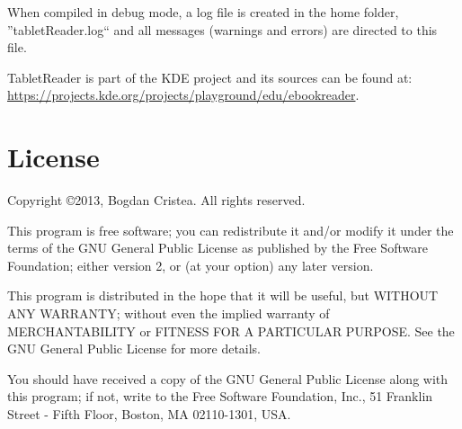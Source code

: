 \documentclass[journal,12pt]{IEEEtran}
\begin{document}
When compiled in debug mode, a log file is created in the home folder, ''tabletReader.log`` and all messages (warnings and errors) are directed to this file.

TabletReader is part of the KDE project and its sources can be found at: \url{https://projects.kde.org/projects/playground/edu/ebookreader}.

\section{License}
 Copyright \copyright 2013, Bogdan Cristea. All rights reserved.
 
 This program is free software; you can redistribute it and/or modify  it under the terms of the GNU General Public License as published by the Free Software Foundation; either version 2, or (at your option)  any later version.
 
 This program is distributed in the hope that it will be useful,  but WITHOUT ANY WARRANTY; without even the implied warranty of
 MERCHANTABILITY or FITNESS FOR A PARTICULAR PURPOSE.  See the  GNU General Public License for more details.
 
 You should have received a copy of the GNU General Public License along with this program; if not, write to the Free Software
 Foundation, Inc., 51 Franklin Street - Fifth Floor, Boston, MA 02110-1301, USA.
\end{document}
